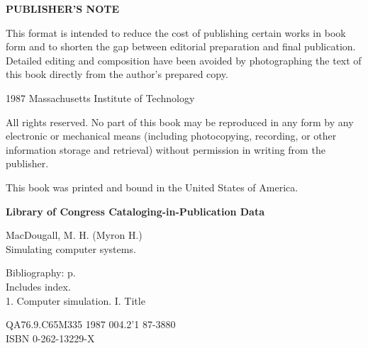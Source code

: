 \clearpage
\thispagestyle{empty}

\begingroup
\fontsize{13.2}{15.6}\selectfont
\begin{center}
  {\bfseries PUBLISHER'S NOTE}
\end{center}

This format is intended to reduce the cost of publishing certain works in book
form and to shorten the gap between editorial preparation and final
publication. Detailed editing and composition have been avoided by photographing
the text of this book directly from the author's prepared copy.

\vspace{0.7\baselineskip}
\noindent \textcopyright{} 1987 Massachusetts Institute of Technology

\vspace{0.7\baselineskip}
\noindent All rights reserved. No part of this book may be reproduced in any form
by any electronic or mechanical means (including photocopying, recording, or
other information storage and retrieval) without permission in writing from the
publisher.

\vspace{0.7\baselineskip}
\noindent This book was printed and bound in the United States of America.

\vspace{1.1\baselineskip}
\noindent \textbf{Library of Congress Cataloging-in-Publication Data}

\vspace{0.4\baselineskip}
\noindent MacDougall, M. H. (Myron H.)\\
\noindent \hspace*{1.2em} Simulating computer systems.

\vspace{0.4\baselineskip}
\noindent \hspace*{1.2em} Bibliography: p.\\
\noindent \hspace*{1.2em} Includes index.\\
\noindent \hspace*{1.2em} 1. Computer simulation. I. Title

\vspace{0.4\baselineskip}
\noindent QA76.9.C65M335 \hspace*{2em} 1987 \hspace*{2em} 004.2'1 \hspace*{2em} 87-3880\\
\noindent ISBN 0-262-13229-X
\endgroup
